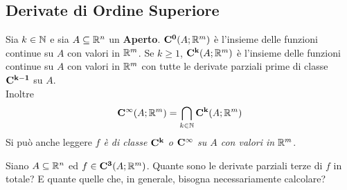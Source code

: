 \subsection{Derivate di Ordine Superiore}
\begin{definition}
	Sia $k \in \mathbb{N}$ e sia $A \subseteq \mathbb{R}^n$ un \textbf{Aperto}. $\mathbf{C^{0}}(A;\mathbb{R}^m)$ è l'insieme delle funzioni continue su $A$ con valori in $\mathbb{R}^m$. Se $k \geq 1$, $\mathbf{C^{k}}(A;\mathbb{R}^m)$ è l'insieme delle funzioni continue su $A$ con valori in $\mathbb{R}^m$ con tutte le derivate parziali prime di classe $\mathbf{C^{k-1}}$ su $A$.\\
	Inoltre
	\[\mathbf{C^{\infty}}(A;\mathbb{R}^m) = \bigcap\limits_{k \in \mathbb{N}}\mathbf{C^{k}}(A;\mathbb{R}^m)\]
	Si può anche leggere \textit{$f$ è di classe $\mathbf{C^{k}}$ o $\mathbf{C^{\infty}}$ su $A$ con valori in $\mathbb{R}^m$}.
\end{definition}
\begin{exercise}
	Siano $A \subseteq \mathbb{R}^n$ ed $f \in \mathbf{C^{3}}(A;\mathbb{R}^m)$. Quante sono le derivate parziali terze di $f$ in totale? E quante quelle che, in generale, bisogna necessariamente calcolare?
\end{exercise}

\newpage
